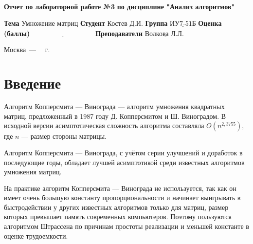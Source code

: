 \documentclass[12pt]{report}
\begin{document}
\begin{titlepage}
	
	\begin{center}
		\noindent\begin{minipage}{1.3\textwidth}\centering
			\Large\textbf{  Отчет по лабораторной работе №3}\newline
			\textbf{по дисциплине "Анализ алгоритмов"}\newline\newline
		\end{minipage}
	\end{center}
	
	\noindent\textbf{Тема} $\underline{\text{Умножение матриц}}$\newline\newline
	\noindent\textbf{Студент} $\underline{\text{Костев Д.И.}}$\newline\newline
	\noindent\textbf{Группа} $\underline{\text{ИУ7-51Б}}$\newline\newline
	\noindent\textbf{Оценка (баллы)} $\underline{\text{~~~~~~~~~~~~~~~~~~~~~~~~~~~}}$\newline\newline
	\noindent\textbf{Преподаватели} $\underline{\text{Волкова Л.Л. }}$\newline\newline\newline
	
	\begin{center}
		\vfill
		Москва~---~\the\year
		~г.
	\end{center}
\end{titlepage}

\setcounter{page}{2}
\tableofcontents

\newpage
\chapter*{Введение}
Алгоритм Копперсмита — Винограда — алгоритм умножения квадратных матриц, предложенный в 1987 году Д. Копперсмитом и Ш. Виноградом.
В исходной версии асимптотическая сложность алгоритма составляла $O(n^{2,3755})$, где  $n$ — размер стороны матрицы.

Алгоритм Копперсмита — Винограда, с учётом серии улучшений и доработок в последующие годы, обладает лучшей асимптотикой среди известных алгоритмов умножения матриц.

На практике алгоритм Копперсмита — Винограда не используется, так как он имеет очень большую константу пропорциональности и начинает выигрывать в быстродействии у других известных алгоритмов только для матриц, размер которых превышает память современных компьютеров.
Поэтому пользуются алгоритмом Штрассена по причинам простоты реализации и меньшей константе в оценке трудоемкости.
\end{document}
